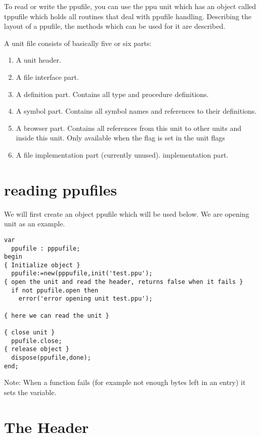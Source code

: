 \documentclass{report}
\begin{document}
To read or write the ppufile, you can use the ppu unit 
which has an object called tppufile which holds all routines that deal
with ppufile handling. Describing the layout of a ppufile, the methods
which can be used for it are described.

A unit file consists of basically five or six parts:
\begin{enumerate}
\item A unit header.
\item A file interface part.
\item A definition part. Contains all type and procedure definitions.
\item A symbol part. Contains all symbol names and references to their
definitions.
\item A browser part. Contains all references from this unit to other
units and inside this unit. Only available when the  flag is
set in the unit flags
\item A file implementation part (currently unused).
implementation part.
\end{enumerate}

\section{reading ppufiles}

We will first create an object ppufile which will be used below. We are
opening unit  as an example.

\begin{verbatim}
var
  ppufile : pppufile;
begin
{ Initialize object }
  ppufile:=new(pppufile,init('test.ppu');
{ open the unit and read the header, returns false when it fails }
  if not ppufile.open then
    error('error opening unit test.ppu');

{ here we can read the unit }

{ close unit }
  ppufile.close;
{ release object }
  dispose(ppufile,done);
end;
\end{verbatim}

Note: When a function fails (for example not enough bytes left in an
entry) it sets the  variable.

\section{The Header}
\end{document}
